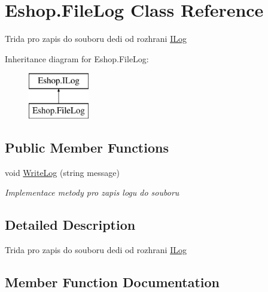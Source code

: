 \hypertarget{class_eshop_1_1_file_log}{}\section{Eshop.\+File\+Log Class Reference}
\label{class_eshop_1_1_file_log}


Trida pro zapis do souboru dedi od rozhrani \mbox{\hyperlink{interface_eshop_1_1_i_log}{I\+Log}}  


Inheritance diagram for Eshop.\+File\+Log\+:\begin{figure}[H]
\begin{center}
\leavevmode
\includegraphics[height=2.000000cm]{class_eshop_1_1_file_log}
\end{center}
\end{figure}
\subsection*{Public Member Functions}
\begin{DoxyCompactItemize}
\item 
void \mbox{\hyperlink{class_eshop_1_1_file_log_af424c7796430dcbcc996caea5cb852de}{Write\+Log}} (string message)
\begin{DoxyCompactList}\small\item\em Implementace metody pro zapis logu do souboru \end{DoxyCompactList}\end{DoxyCompactItemize}


\subsection{Detailed Description}
Trida pro zapis do souboru dedi od rozhrani \mbox{\hyperlink{interface_eshop_1_1_i_log}{I\+Log}} 



\subsection{Member Function Documentation}
\mbox{\label{class_eshop_1_1_file_log_af424c7796430dcbcc996caea5cb852de}} 
